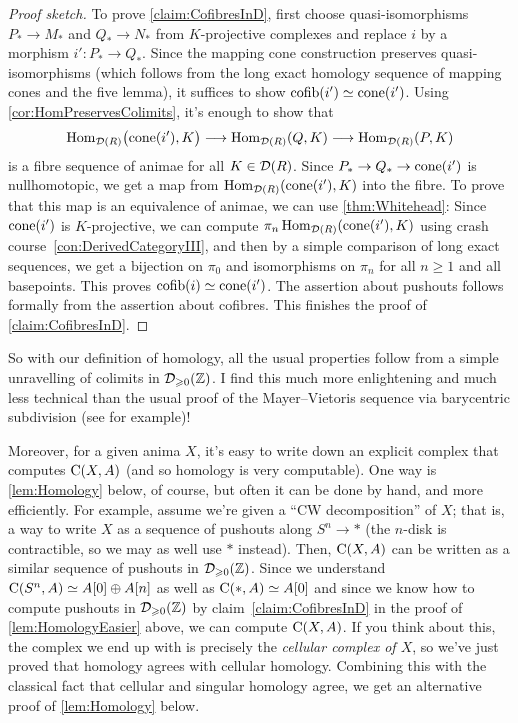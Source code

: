 \begin{proof}[Proof sketch]
	To prove \cref{claim:CofibresInD}, first choose quasi-isomorphisms $P_*\rightarrow M_*$ and $Q_*\rightarrow N_*$ from $K$-projective complexes and replace $i$ by a morphism $i'\colon P_*\rightarrow Q_*$. Since the mapping cone construction preserves quasi-isomorphisms (which follows from the long exact homology sequence of mapping cones and the five lemma), it suffices to show $\operatorname{cofib}(i')\simeq \operatorname{cone}(i')$. Using \cref{cor:HomPreservesColimits}, it's enough to show that
	\begin{equation*}
		\Hom_{\Dd(R)}\lef(\cone(i'),K\righ)\longrightarrow\Hom_{\Dd(R)}(Q,K)\longrightarrow\Hom_{\Dd(R)}(P,K)
	\end{equation*}
	is a fibre sequence of animae for all $K\in\mathcal{D}(R)$. Since $P_*\rightarrow Q_*\rightarrow\operatorname{cone}(i')$ is nullhomotopic, we get a map from $\Hom_{\Dd(R)}\lef(\cone(i'),K\righ)$ into the fibre. To prove that this map is an equivalence of animae, we can use \cref{thm:Whitehead}: Since $\operatorname{cone}(i')$ is $K$-projective, we can compute $\pi_n\operatorname{Hom}_{\mathcal{D}(R)}(\operatorname{cone}(i'),K)$ using crash course~\cref{con:DerivedCategoryIII}, and then by a simple comparison of long exact sequences, we get a bijection on $\pi_0$ and isomorphisms on $\pi_n$ for all $n\geqslant 1$ and all basepoints. This proves $\operatorname{cofib}(i)\simeq \operatorname{cone}(i')$. The assertion about pushouts follows formally from the assertion about cofibres. This finishes the proof of \cref{claim:CofibresInD}. 
\end{proof}
\begin{rem}
	So with our definition of homology, all the usual properties follow from a simple unravelling of colimits in $\mathcal{D}_{\geqslant 0}(\mathbb{Z})$. I find this much more enlightening and much less technical than the usual proof of the Mayer--Vietoris sequence via barycentric subdivision (see \cite[Proposition~\href{https://pi.math.cornell.edu/~hatcher/AT/AT.pdf\#page=128}{2.21}]{Hatcher} for example)!
	
	Moreover, for a given anima $X$, it's easy to write down an explicit complex that computes $\operatorname{C}(X,A)$ (and so homology is very computable). One way is \cref{lem:Homology} below, of course, but often it can be done by hand, and more efficiently. For example, assume we're given a \enquote{CW decomposition} of $X$; that is, a way to write $X$ as a sequence of pushouts along $S^n\rightarrow *$ (the $n$-disk is contractible, so we may as well use $*$ instead). Then, $\operatorname{C}(X,A)$ can be written as a similar sequence of pushouts in $\mathcal{D}_{\geqslant 0}(\mathbb{Z})$. Since we understand $\operatorname{C}(S^n,A)\simeq A[0]\oplus A[n]$ as well as $\operatorname{C}(*,A)\simeq A[0]$ and since we know how to compute pushouts in $\mathcal{D}_{\geqslant 0}(\mathbb{Z})$ by claim~\cref{claim:CofibresInD} in the proof of \cref{lem:HomologyEasier} above, we can compute $\operatorname{C}(X,A)$. If you think about this, the complex we end up with is precisely the \emph{cellular complex of $X$}, so we've just proved that homology agrees with cellular homology. Combining this with the classical fact that cellular and singular homology agree, we get an alternative proof of \cref{lem:Homology} below.
\end{rem}
